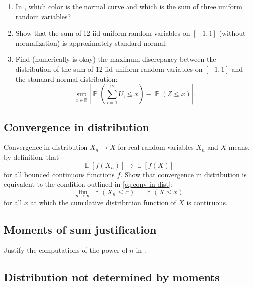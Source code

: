 \documentclass[letterpaper,11pt,oneside,reqno]{article}
\numberwithin{equation}{section}
\theoremstyle{definition}
\begin{document}
\begin{enumerate}
	\item In , which color is
		the normal curve and which is the sum of three uniform random variables?
	\item Show that the sum of 12 iid uniform random variables on $[-1,1]$
		(without normalization) is approximately standard normal.
	\item Find (numerically is okay)
		the maximum discrepancy between the distribution of the sum of 12 iid uniform random variables on $[-1,1]$ and the standard normal distribution:
		\begin{equation*}
			\sup_{x \in \mathbb{R}} \left| \operatorname{\mathbb{P}}\left(  \sum_{i=1}^{12} U_i \leq x \right) - \operatorname{\mathbb{P}}\left( Z \leq x \right) \right|.
		\end{equation*}
\end{enumerate}

\subsection{Convergence in distribution}
\label{sub:conv-in-dist-problem}

Convergence in distribution $X_n\to X$
for real random variables $X_n$ and $X$ means, by definition,
that
\begin{equation*}
	\operatorname{\mathbb{E}}[f(X_n)] \to \operatorname{\mathbb{E}}[f(X)]
\end{equation*}
for all bounded continuous functions $f$.
Show that convergence in distribution
is equivalent to the condition outlined in \eqref{eq:conv-in-dist}:
\begin{equation*}
	\lim_{n \to \infty} \operatorname{\mathbb{P}}(X_n \leq x) = \operatorname{\mathbb{P}}(X \leq x)
\end{equation*}
for all $x$ at which the cumulative distribution function of $X$ is continuous.

\subsection{Moments of sum justification}

Justify the computations of the power of $n$ in
.

\subsection{Distribution not determined by moments}
\end{document}

